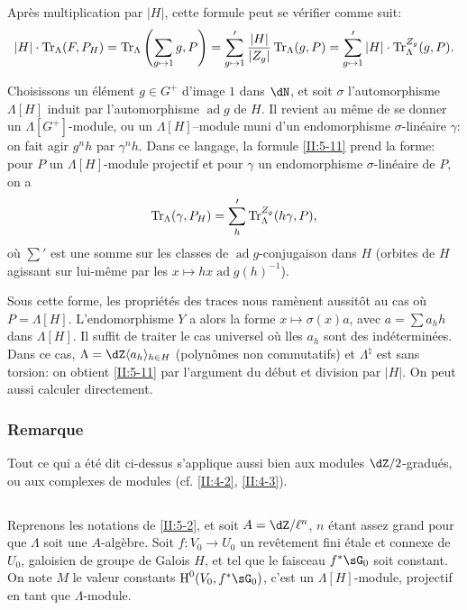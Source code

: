 Après multiplication par $|H|$, cette formule peut se vérifier comme suit: 
\[
  |H|\cdot \operatorname{Tr}_\Lambda(F,P_H) 
    = \operatorname{Tr}_\Lambda\left(\sum_{g\mapsto 1} g,P\right) 
    = \sum_{g\mapsto 1}' \frac{|H|}{|Z_g|}\operatorname{Tr}_\Lambda(g,P) 
    = \sum_{g\mapsto 1}' |H|\cdot \operatorname{Tr}_\Lambda^{Z_g}(g,P) \text{.}
\]

Choisissons un élément $g\in G^+$ d'image $1$ dans $\dN$, et soit 
$\sigma$ l'automorphisme $\Lambda[H]$ induit par l'automorphisme 
$\operatorname{ad} g$ de $H$. Il revient au même de se donner un 
$\Lambda[G^+]$-module, ou un $\Lambda[H]$--module muni d'un endomorphisme 
$\sigma$-linéaire $\gamma$: on fait agir $g^n h$ par $\gamma^n h$. Dans ce 
langage, la formule \ref{II:5-11} prend la forme: pour $P$ un 
$\Lambda[H]$-module projectif et pour $\gamma$ un endomorphisme 
$\sigma$-linéaire de $P$, on a 
\[
  \operatorname{Tr}_\Lambda(\gamma,P_H) = \sum_h' \operatorname{Tr}_\Lambda^{Z_g}(h\gamma,P)\text{,}
\]
où $\sum'$ est une somme sur les classes de $\operatorname{ad}g$-conjugaison 
dans $H$ (orbites de $H$ agissant sur lui-même par les 
$x\mapsto h x \operatorname{ad} g(h)^{-1}$). 

Sous cette forme, les propriétés des traces nous ramènent aussitôt au 
cas où $P=\Lambda[H]$. L'endomorphisme $Y$ a alors la forme 
$x\mapsto \sigma(x) a$, avec $a=\sum a_h h$ dans $\Lambda[H]$. Il suffit de 
traiter le cas universel où lles $a_h$ sont des indéterminées. Dans ce 
cas, $\Lambda=\dZ\langle a_h\rangle_{h\in H}$ (polynômes non commutatifs) et 
$\Lambda^\natural$ est sans torsion: on obtient \ref{II:5-11} par l'argument 
du début et division par $|H|$. On peut aussi calculer directement. 





\subsubsection{Remarque}\label{II:5-11-1}

Tout ce qui a été dit ci-dessus s'applique aussi bien aux modules 
$\dZ/2$-gradués, ou aux complexes de modules (cf. \ref{II:4-2}, \ref{II:4-3}). 





\subsection{}\label{II:5-12}

Reprenons les notations de \ref{II:5-2}, et soit $A=\dZ/\ell^n$, $n$ étant 
assez grand pour que $\Lambda$ soit une $A$-algèbre. Soit $f:V_0\to U_0$ un 
revêtement fini étale et connexe de $U_0$, galoisien de groupe de Galois 
$H$, et tel que le faisceau $f^*\sG_0$ soit constant. On note $M$ le valeur 
constants $\h^0(V_0,f^*\sG_0)$, c'est un $\Lambda[H]$-module, projectif en 
tant que $\Lambda$-module. 

